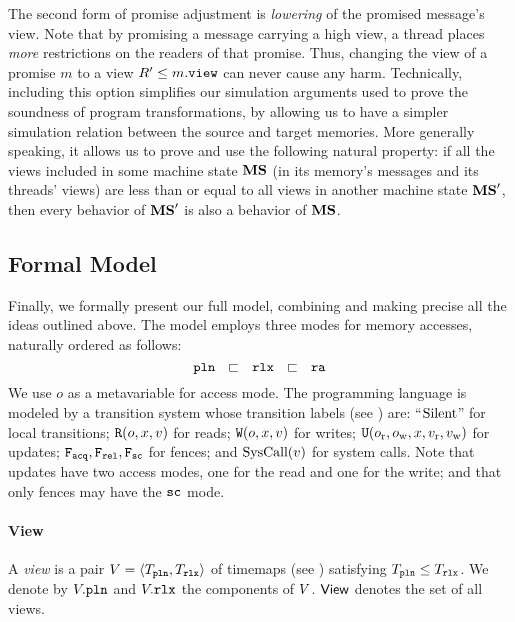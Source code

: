 The second form of promise adjustment is \emph{lowering} of the promised message's view.
Note that by promising a message carrying a high view, a thread places \emph{more} restrictions on the readers of that promise.
Thus, changing the view of a promise $m$ to a view $R'\leq m.\texttt{view}$ can never cause any harm.
Technically, including this option simplifies our simulation arguments used to prove the soundness of program transformations,
by allowing us to have a simpler simulation relation between the source and target memories.
More generally speaking, it allows us to prove and use the following natural property:
if all the views included in some machine state ${\mathbf{MS}}$ (in its memory's messages and its threads' views)
are less than or equal to all views in another machine state ${\mathbf{MS}}'$, 
then every behavior of ${\mathbf{MS}}'$ is also a behavior of ${\mathbf{MS}}$.

\subsection{Formal Model}
\label{sec:full-formal}

\figfull

Finally, we formally present our full model,
combining and making precise all the ideas outlined above.
The model employs three modes for memory accesses, naturally ordered as follows:
\[\texttt{pln} ~~\sqsubset~~\texttt{rlx}~~\sqsubset~~\texttt{ra}\]
We use $o$ as a metavariable for access mode.
The programming language is modeled by a transition system whose 
transition labels (see ) are:
``${\text{Silent}}$'' for local transitions;
${\texttt{R}(o,x,v)}$  for reads;
${\texttt{W}(o,x,v)}$  for writes;
${\texttt{U}(o_{\text{r}},o_{\text{w}},x,v_{\text{r}},v_{\text{w}})}$  for updates;
${\texttt{F}_{\texttt{acq}}},{\texttt{F}_{\texttt{rel}}},{\texttt{F}_{\texttt{sc}}}$ for fences;
and  ${{\text{SysCall}(v)}}$ for system calls.
Note that updates have two access modes, one for the read and one for the write;
and that only fences may have the ${\texttt{sc}}$ mode.

\paragraph{View}
A \emph{view} is a pair $V={\langle{T_{\texttt{pln}},T_{\texttt{rlx}}}\rangle}$ of timemaps (see )
satisfying $T_{\texttt{pln}} \leq T_{\texttt{rlx}}$.
We denote by $V.{\texttt{pln}}$ and $V.{\texttt{rlx}}$ the components of $V$.
${\mathsf{View}}$ denotes the set of all views.

